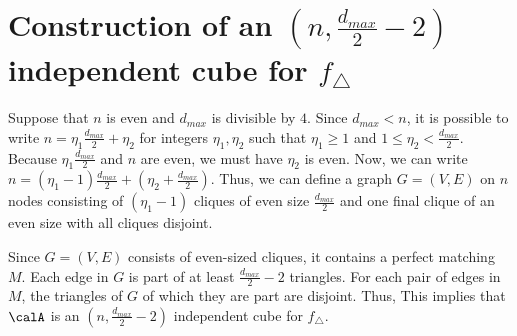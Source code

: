 
\section{Construction of an $(n, \frac{d_{max}}{2}-2)$ independent cube for $f_\triangle$}
\label{sub:cube_triangle}
Suppose that $n$ is even and $d_{max}$ is divisible by $4$.
Since $d_{max} < n$, it is possible to write 
$n = \eta_1 \frac{d_{max}}{2} + \eta_2$ 
for integers 
$\eta_1, \eta_2$
such that 
$\eta_1 \geq 1$ and $1 \leq \eta_2 < \frac{d_{max}}{2}$. 
Because 
$\eta_1 \frac{d_{max}}{2}$ 
and $n$ are even, 
we must have 
$\eta_2$ 
is even.
Now, we can write 
$n = (\eta_1-1) \frac{d_{max}}{2} + (\eta_2 + \frac{d_{max}}{2})$.
Thus, 
we can define 
a graph $G=(V,E)$ on $n$ 
nodes 
consisting of 
$(\eta_1-1)$ 
cliques of 
even 
size
$\frac{d_{max}}{2}$ and one final clique of an even size  
with all cliques disjoint. 

Since $G=(V,E)$ consists of even-sized cliques, it contains a perfect matching $M$. 
Each edge in $G$ is part of at least $\frac{d_{max}}{2}-2$ triangles. 
For each pair of edges in $M$, the triangles of $G$ of which they are part
are disjoint. 
Thus, 
 This implies 
that $\calA$ 
is an $(n,\frac{d_{max}}{2}-2)$ independent cube for $f_\triangle$.

